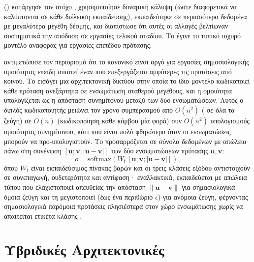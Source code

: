 \textbf{} \cite{liu2019roberta} () κατάργησε τον στόχο , χρησιμοποίησε δυναμική κάλυψη (ώστε διαφορετικά
 να καλύπτονται σε κάθε διέλευση εκπαίδευσης), εκπαιδεύτηκε σε περισσότερα
δεδομένα με μεγαλύτερα μεγέθη δέσμης, και διαπίστωσε ότι αυτές οι αλλαγές βελτίωναν
συστηματικά την απόδοση σε εργασίες τελικού σταδίου.
Το  έγινε το τυπικό ισχυρό
μοντέλο αναφοράς για εργασίες  επιπέδου πρότασης.

\textbf{} \cite{reimers2019sentence} αντιμετώπισε τον περιορισμό ότι το
κανονικό  είναι αργό για εργασίες σημασιολογικής ομοιότητας επειδή απαιτεί έναν
 που επεξεργάζεται αμφότερες τις προτάσεις από κοινού.
Το
 εισάγει μια αρχιτεκτονική  δικτύου στην οποία το ίδιο
μοντέλο  κωδικοποιεί κάθε πρόταση ανεξάρτητα σε ενσωμάτωση σταθερού μεγέθους,
και η ομοιότητα υπολογίζεται ως η απόσταση συνημίτονου μεταξύ των δύο ενσωματώσεων.
Αυτός ο διπλός κωδικοποιητής μειώνει τον χρόνο συμπερασμού από $O(n^2)$
( σε όλα τα ζεύγη) σε $O(n)$ (κωδικοποίηση κάθε κόμβου
μία φορά) συν $O(n^2)$ υπολογισμούς ομοιότητας συνημίτονου, κάτι που είναι πολύ
φθηνότερο όταν οι ενσωματώσεις μπορούν να προ-υπολογιστούν.
Το 
προσαρμόζεται σε σύνολα δεδομένων  με απώλεια
 πάνω στη συνένωση $[\mathbf{u}; \mathbf{v}; |\mathbf{u} - \mathbf{v}|]$
των δύο ενσωματώσεων πρότασης $\mathbf{u}, \mathbf{v}$:
\begin{equation}
    o = \mathrm{softmax}\!\left(W_t \, [\mathbf{u}; \mathbf{v}; |\mathbf{u} - \mathbf{v}|]\right),
    \label{eq:sbert-softmax}
\end{equation}
όπου $W_t$ είναι εκπαιδεύσιμος πίνακας βαρών και οι τρεις κλάσεις εξόδου αντιστοιχούν
σε συνεπαγωγή, ουδετερότητα και αντίφαση· εναλλακτικά, εκπαιδεύεται με απώλεια
τύπου  που ελαχιστοποιεί απευθείας την απόσταση
$\| \mathbf{u} - \mathbf{v} \|$ για σημασιολογικά όμοια ζεύγη και τη μεγιστοποιεί
(έως ένα περιθώριο $\epsilon$) για ανόμοια ζεύγη, φέρνοντας σημασιολογικά παρόμοια
προτάσεις πλησιέστερα στον χώρο ενσωμάτωσης χωρίς να απαιτείται ετικέτα κλάσης
.


\section{Υβριδικές Αρχιτεκτονικές}
\label{sec:hybrid-architectures}

